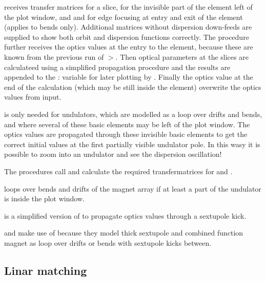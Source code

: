 \documentclass[12pt]{article}
\newcommand\code[1]{{\tt #1}}
\newcommand{\unico}[1]{{\color{burntorange}\code{#1}}}
\newcommand{\prcod}[2]{\opauni{#1}$>$\unico{#2}}
\newcommand{\vrcod}[2]{\opauni{#1}:\unico{#2}}
\newcommand{\opagui}[1]{\colorbox{blue!20}{{\color{black}\code{#1}}}}
\newcommand{\oguih}[2]{\subsection{\label{#2}#1}{\Huge\opagui{#2}}\\}
\newcommand{\opauni}[1]{\colorbox{orange!30}{{\color{black}\code{#1}}}}
\newcommand{\ouni}[1]{\hyperref[#1]{\opauni{#1}}}
\newcommand{\feature}[1]{{\color{cadmiumgreen} #1}}
\begin{document}
\unico{SlicingN} receives transfer matrices \unico{msl} for a slice, \unico{mof} for the invisible part of the element left of the plot window, and \unico{min} and \unico{mex} for edge focusing at entry and exit of the element (applies to bends only). Additional matrices \unico{mof0,msl0} without dispersion down-feeds are supplied to show both orbit and dispersion functions correctly. The procedure further receives the optics values at the entry to the element, because these are known from the previous run of \prcod{linoplib}{Lattel}. Then optical parameters at the slices are calculateed using a simplified propagation procedure and the results are appended to the \vrcod{globlib}{Curve} variable for later plotting by \ouni{linoplib}. Finally the optics value at the end of the calculation (which may be still inside the element) overwrite the optics values from input.

\unico{SkippingN} is only needed for undulators, which are modelled as a loop over drifts and bends, and where several of these basic elements may be left of the plot window. The optics values are propagated through these invisible basic elements to get the correct initial values at the first partially visible undulator pole. \feature{In this wasy it is possible to zoom into an undulator and see the dispersion oscillation!}

The \unico{Slice(Drift,Quad,Sol,Bend)N} procedures call \unico{SliceSet} and calculate the required transfermatrices for \unico{SlicingN} and \unico{SkippingN}.

\unico{SliceUnduN} loops over bends and drifts of the magnet array if at least a part of the undulator is inside the plot window.

\unico{SextKickN} is a simplified version of \unico{ThinSextupole} to propagate optics values through a sextupole kick.

\unico{SliceSextN} and \unico{SliceCombN} make use of \unico{SextKickN} because they model thick sextupole and combined function magnet as loop over drifts or bends with sextupole kicks between.



\oguih{Linar matching}{omatching} 
\end{document}
